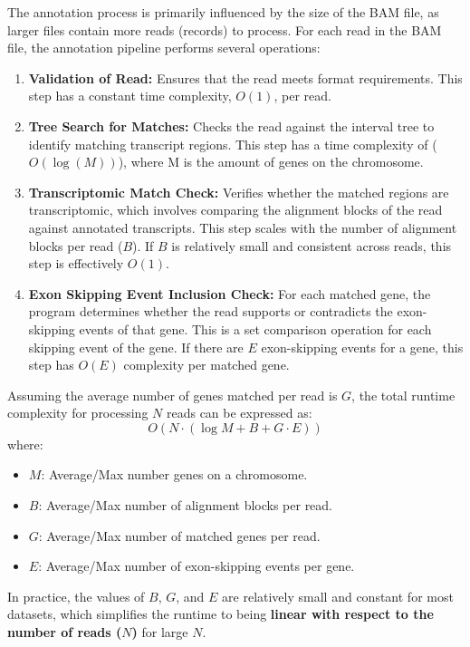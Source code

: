 \documentclass{article}
\begin{document}
    The annotation process is primarily influenced by the size of the BAM file, as larger files contain more reads (records) to process. For each read in the BAM file, the annotation pipeline performs several operations:

    \begin{enumerate}
        \item \textbf{Validation of Read:} Ensures that the read meets format requirements. This step has a constant time complexity, \(O(1)\), per read.
        \item \textbf{Tree Search for Matches:} Checks the read against the interval tree to identify matching transcript regions. This step has a time complexity of ($O(\log(M))$), where M is the amount of genes on the chromosome.
        \item \textbf{Transcriptomic Match Check:} Verifies whether the matched regions are transcriptomic, which involves comparing the alignment blocks of the read against annotated transcripts. This step scales with the number of alignment blocks per read (\(B\)). If \(B\) is relatively small and consistent across reads, this step is effectively \(O(1)\).
        \item \textbf{Exon Skipping Event Inclusion Check:} For each matched gene, the program determines whether the read supports or contradicts the exon-skipping events of that gene. This is a set comparison operation for each skipping event of the gene. If there are \(E\) exon-skipping events for a gene, this step has \(O(E)\) complexity per matched gene.
    \end{enumerate}

    Assuming the average number of genes matched per read is \(G\), the total runtime complexity for processing \(N\) reads can be expressed as:
    \[
        O(N \cdot (\log M + B + G \cdot E))
    \]
    where:
    \begin{itemize}
        \item \(M\): Average/Max number genes on a chromosome.
        \item \(B\): Average/Max number of alignment blocks per read.
        \item \(G\): Average/Max number of matched genes per read.
        \item \(E\): Average/Max number of exon-skipping events per gene.
    \end{itemize}

    In practice, the values of \(B\), \(G\), and \(E\) are relatively small and constant for most datasets, which simplifies the runtime to being \textbf{linear with respect to the number of reads (\(N\))} for large \(N\).
\end{document}
